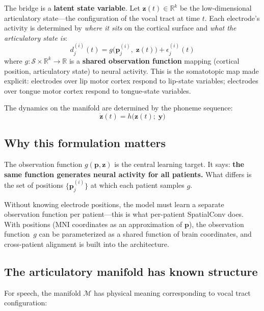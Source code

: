 \documentclass[11pt,letterpaper]{article}
\newcommand{\bfp}{\mathbf{p}}
\newcommand{\bfz}{\mathbf{z}}
\newcommand{\bfy}{\mathbf{y}}
\newcommand{\cS}{\mathcal{S}}
\newcommand{\cM}{\mathcal{M}}
\newcommand{\R}{\mathbb{R}}
\begin{document}
The bridge is a \textbf{latent state variable}. Let $\bfz(t) \in \R^k$ be the low-dimensional articulatory state---the configuration of the vocal tract at time $t$. Each electrode's activity is determined by \emph{where it sits} on the cortical surface and \emph{what the articulatory state is}:
\begin{equation}\label{eq:obs-function}
d_j^{(i)}(t) = g\bigl(\bfp_j^{(i)},\; \bfz(t)\bigr) + \epsilon_j^{(i)}(t)
\end{equation}
where $g: \cS \times \R^k \to \R$ is a \textbf{shared observation function} mapping (cortical position, articulatory state) to neural activity. This is the somatotopic map made explicit: electrodes over lip motor cortex respond to lip-state variables; electrodes over tongue motor cortex respond to tongue-state variables.

The dynamics on the manifold are determined by the phoneme sequence:
\begin{equation}\label{eq:dynamics}
\dot{\bfz}(t) = h\bigl(\bfz(t);\; \bfy\bigr)
\end{equation}

\subsection{Why this formulation matters}

The observation function $g(\bfp, \bfz)$ is the central learning target. It says: \textbf{the same function generates neural activity for all patients.} What differs is the set of positions $\{\bfp_j^{(i)}\}$ at which each patient samples $g$.

Without knowing electrode positions, the model must learn a separate observation function per patient---this is what per-patient SpatialConv does. With positions (MNI coordinates as an approximation of $\bfp$), the observation function~$g$ can be parameterized as a shared function of brain coordinates, and cross-patient alignment is built into the architecture.

\subsection{The articulatory manifold has known structure}

For speech, the manifold $\cM$ has physical meaning corresponding to vocal tract configuration:
\end{document}
